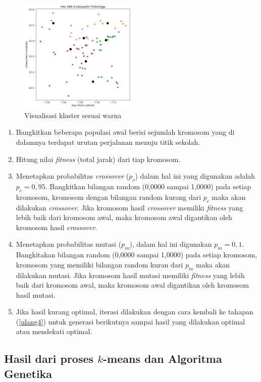 \begin{figure}[H]
	\centering
	\includegraphics[width=0.5\textwidth]{Gambar/hasil klaster.png}
	\caption{Visualisasi klaster sesuai warna}
	\label{fig:hasilklas}
\end{figure}

\begin{enumerate}
	\item Bangkitkan beberapa populasi awal berisi sejumlah kromosom yang di dalamnya terdapat urutan perjalanan menuju titik sekolah.
	\item \label{ulang4} Hitung nilai \textit{fitness} (total jarak) dari tiap kromosom.
	\item Menetapkan probabilitas \textit{crossover} ($p_c$) dalam hal ini yang digunakan adalah $p_c=0,95$. Bangkitkan bilangan random (0,0000 sampai 1,0000) pada setiap kromosom, kromosom dengan bilangan random kurang dari $p_c$ maka akan dilakukan \textit{crossover}. Jika kromosom hasil \textit{crossover} memiliki \textit{fitness} yang lebih baik  dari kromosom awal, maka kromosom awal digantikan oleh kromosom hasil \textit{crossover}.
	\item Menetapkan probabilitas mutasi ($p_m$), dalam hal ini digunakan $p_m=0,1$. Bangkitakan bilangan random (0,0000 sampai 1,0000) pada setiap kromosom, kromosom yang memiliki bilangan random kuran dari $p_m$ maka akan dilakukan mutasi. Jika kromosom hasil mutasi memiliki \textit{fitness} yang lebih baik dari kromosom awal, maka kromosom awal digantikan oleh kromosom hasil mutasi.
	\item Jika hasil kurang optimal, iterasi dilakukan dengan cara kembali ke tahapan (\ref{ulang4}) untuk generasi berikutnya sampai hasil yang dilakukan optimal atau mendekati optimal.
\end{enumerate}

\subsection{Hasil dari proses \textbf{$k$}-means dan Algoritma Genetika}

